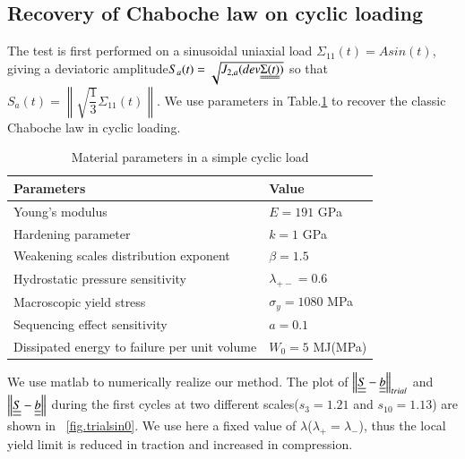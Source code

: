 \documentclass[3p,times,procedia,number]{elsarticle}
\newcommand{\figref}[1]{\figurename~\ref{#1}}
\begin{document}
\subsection{Recovery of Chaboche law on cyclic loading}
The test is first performed on a sinusoidal uniaxial load $\Sigma_{11}(t)=Asin(t)$, giving a deviatoric amplitude$S_{a}(t)=\sqrt{J_{2,a}(dev\uuline{\Sigma(t)})}$  so that $S_{a}(t)=\left\| \sqrt{\dfrac{1}{3}}\Sigma_{11}(t)\right\| $. We use parameters in Table.\ref{tab:Sin} to recover the classic Chaboche law in cyclic loading.
\begin{table}[!h]
	\centering
	\begin{tabular}{ll}
		\hline
		\textbf{Parameters}                                         & \textbf{Value}                    \\ \hline
		Young's modulus                                             & $E=191$ GPa                       \\
		Hardening parameter                                         &  $k=1$ GPa \\
		Weakening scales distribution exponent                      & $\beta=1.5$                             \\
		Hydrostatic pressure sensitivity                            & $\lambda_{+-}=0.6$                     \\
		Macroscopic yield stress                                    & $\sigma_y=1080$ MPa              \\
		Sequencing effect sensitivity                               & $a=0.1$                        \\
		Dissipated energy to failure per unit volume                & $W_0=5$ MJ(MPa)                       \\ \hline
	\end{tabular}
	\caption{Material parameters in a simple cyclic load }
	\label{tab:Sin}
\end{table}

We use matlab to numerically realize our method. The plot of $\left\|  \uline{\uline{S}}-\uline{\uline{b}}\right\|_{trial}$ and $\left\|  \uline{\uline{S}}-\uline{\uline{b}}\right\|$ during the first cycles at two different scales($s_{3}=1.21$ and $s_{10}=1.13$) are shown in \figref{fig.trialsin0}. We use here a fixed value of $\lambda$($\lambda_+=\lambda_-$), thus the local yield limit is reduced in traction and increased
in compression.
\end{document}
